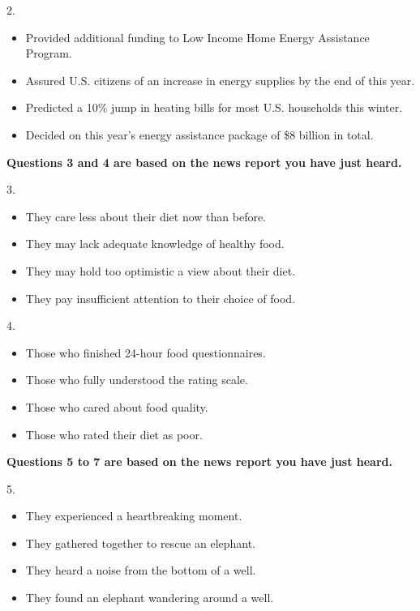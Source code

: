 \documentclass[UTF8,11pt]{ctexart}
\begin{document}
2.


\begin{itemize}[leftmargin=2em,itemsep=.2em,topsep=.4em]\item[A.] Provided additional funding to Low Income Home Energy Assistance Program.
\item[B.] Assured U.S. citizens of an increase in energy supplies by the end of this year.
\item[C.] Predicted a 10\% jump in heating bills for most U.S. households this winter.
\item[D.] Decided on this year’s energy assistance package of \$8 billion in total.
\end{itemize}

\textbf{Questions 3 and 4 are based on the news report you have just heard.}


3.


\begin{itemize}[leftmargin=2em,itemsep=.2em,topsep=.4em]\item[A.] They care less about their diet now than before.
\item[B.] They may lack adequate knowledge of healthy food.
\item[C.] They may hold too optimistic a view about their diet.
\item[D.] They pay insufficient attention to their choice of food.
\end{itemize}

4.


\begin{itemize}[leftmargin=2em,itemsep=.2em,topsep=.4em]\item[A.] Those who finished 24-hour food questionnaires.
\item[B.] Those who fully understood the rating scale.
\item[C.] Those who cared about food quality.
\item[D.] Those who rated their diet as poor.
\end{itemize}

\textbf{Questions 5 to 7 are based on the news report you have just heard.}


5.


\begin{itemize}[leftmargin=2em,itemsep=.2em,topsep=.4em]\item[A.] They experienced a heartbreaking moment.
\item[B.] They gathered together to rescue an elephant.
\item[C.] They heard a noise from the bottom of a well.
\item[D.] They found an elephant wandering around a well.
\end{itemize}
\end{document}
